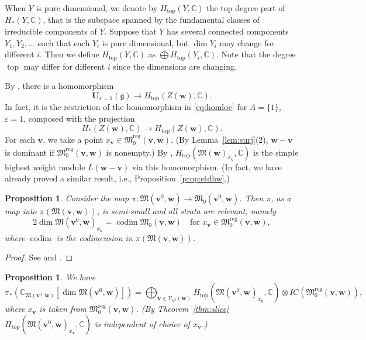 \documentclass[12pt]{amsart}
\def\Bbb{\mathbb}
\def\frak{\mathfrak}
\newcommand{\rom}{\textup}
\newtheorem{Proposition}[equation]{Proposition}
\theoremstyle{definition}
\theoremstyle{remark}
\numberwithin{equation}{subsection}
\newcommand{\thmref}[1]{Theorem~\ref{#1}}
\newcommand{\lemref}[1]{Lemma~\ref{#1}}
\newcommand{\propref}[1]{Proposition~\ref{#1}}
\newcommand{\C}{{\Bbb C}}
\newcommand{\M}{{\frak M}} %
\newcommand{\Mreg}{{\frak M_0^{\operatorname{reg}}}}
\newcommand{\bv}{{\mathbf v}} %
\newcommand{\bw}{{\mathbf w}} %
\newcommand{\codim}{\operatorname{codim}} %
\newcommand{\topdeg}{\operatorname{top}} %
\newcommand{\Ueone}{{\mathbf U}_{\varepsilon = 1}(\mathfrak g)}
\newcommand{\Zw}{Z(\bw)}
\newcommand{\Mw}{\M(\bw)}
\begin{document}
When $Y$ is pure dimensional, we denote by $H_{\topdeg}(Y,\C)$ the top
degree part of $H_*(Y,\C)$, that is the subspace spanned by the
fundamental classes of irreducible components of $Y$. 
%
Suppose that $Y$ has several connected components $Y_1, Y_2, \dots$
such that each $Y_i$ is pure dimensional, but $\dim Y_i$ may change
for different $i$. Then we define $H_{\topdeg}(Y,\C)$ as $\bigoplus
H_{\topdeg}(Y_i,\C)$. Note that the degree $\topdeg$ may differ for
different $i$ since the dimensions are changing.

By \cite[9.4]{Na-alg}, there is a homomorphism
\begin{equation*}
   \Ueone \to
     H_{\topdeg}(\Zw,\C).
\end{equation*}
In fact, it is the restriction of the homomorphism in
\eqref{eq:homloc} for $A = \{1\}$, $\varepsilon = 1$,
composed with the projection
\begin{equation*}
  H_*(\Zw,\C)
  \to H_{\topdeg}(\Zw,\C).
\end{equation*}
%
For each $\bv$, we take a point $x_\bv\in \Mreg(\bv,\bw)$.
(By \lemref{lem:surj}(2), $\bw - \bv$ is dominant if
$\Mreg(\bv,\bw)$ is nonempty.)
By \cite[10.2]{Na-alg}, $H_{\topdeg}(\Mw_{x_{\bv}},\C)$ is the
simple highest weight module $L(\bw-\bv)$ via this homomorphism.
(In fact, we have already proved a similar result, i.e.,
\propref{prop:stdhw}.)

\begin{Proposition}
Consider the map $\pi\colon \M(\bv^0,\bw)\to \M_0(\bv^0,\bw)$.
%
Then $\pi$, as a map into $\pi(\M(\bv,\bw))$, is semi-small
and all strata are relevant, namely
\begin{equation*}
 2 \dim \M(\bv^0,\bw)_{x_{\bv}} = \codim \M_0(\bv,\bw)
 \quad \text{for $x_{\bv}\in \Mreg(\bv,\bw)$},
\end{equation*}
where $\codim$ is the codimension in $\pi(\M(\bv,\bw))$.
\end{Proposition}

\begin{proof}
See \cite[6.11]{Na-quiver} and \cite[10.11]{Na-alg}.
\end{proof}

\begin{Proposition}
We have
\begin{equation}\label{eq:decompQ}
  \pi_*\left(\C_{\M(\bv^0,\bw)}[\dim\M(\bv^0,\bw)]\right)
  = \bigoplus_{\bv\in\mathcal V_{\bv^0}(\bw)}
          H_{\topdeg}(\M(\bv^0,\bw)_{x_{\bv}},\C)\otimes IC(\Mreg(\bv,\bw)),
\end{equation}
where $x_{\bv}$ is taken from $\Mreg(\bv,\bw)$.
\rom(By \thmref{thm:slice} $H_{\topdeg}(\M(\bv^0,\bw)_{x_{\bv}},\C)$
is independent of choice of $x_{\bv}$.\rom)
\end{Proposition}
\end{document}
